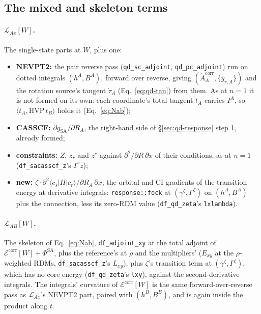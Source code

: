 \documentclass[11pt]{article}
\newcommand{\code}[1]{\texttt{#1}}
\newcommand{\Lag}{\mathcal L}
\begin{document}
\subsection{The mixed and skeleton terms}
\label{sec:qd-mixed}

\paragraph{$\Lag_{Ax}[W]$.} The single-state parts at $W$, plus one:
\begin{itemize}
\item \textbf{NEVPT2:} the pair reverse pass (\code{qd\_sc\_adjoint},
  \code{qd\_pc\_adjoint}) run on dotted integrals $(h^A, B^A)$, forward
  over reverse, giving $(\dot A^{\mathrm{corr}}_A, \{\dot{\bar y}_{r,A}\})$
  and the rotation source's tangent $\dot\tau_A$ (Eq.~\eqref{eq:qd-tau})
  from them. As at $n = 1$ it is not formed on its own: each coordinate's
  total tangent $t_A$ carries $I^A$, so $\langle t_A, \mathrm{HVP}\,t_B\rangle$
  holds it (Eq.~\eqref{eq:Nab});
\item \textbf{CASSCF:} $\partial g_{\mathrm{SA}}/\partial R_A$, the
  right-hand side of \S\ref{sec:qd-response} step 1, already formed;
\item \textbf{constraints:} $Z$, $z_r$ and $z^c$ against
  $\partial^2/\partial R\,\partial x$ of their conditions, as at $n = 1$
  (\code{df\_sacasscf\_z}'s $I^xz$);
\item \textbf{new:} $\zeta\cdot\partial^2\langle c_s|H|c_r\rangle/\partial
  R_A\,\partial x$, the orbital and CI gradients of the transition energy
  at derivative integrals: \code{response::fock} at $(\gamma^\zeta,
  \Gamma^\zeta)$ on $(h^A, B^A)$ plus the connection, less its zero-RDM
  value (\code{df\_qd\_zeta}'s \code{lxlambda}).
\end{itemize}

\paragraph{$\Lag_{AB}[W]$.} The skeleton of Eq.~\eqref{eq:Nab},
\code{df\_adjoint\_xy} at the total adjoint of $\mathcal
E^{\mathrm{corr}}[W] + \Phi^{\mathrm{SA}}$, plus the reference's at $\rho$
and the multipliers' ($E_{xy}$ at the $\rho$-weighted RDMs,
\code{df\_sacasscf\_z}'s $L_{xy}$), plus $\zeta$'s transition term at
$(\gamma^\zeta, \Gamma^\zeta)$, which has no core energy
(\code{df\_qd\_zeta}'s \code{lxy}), against the second-derivative integrals.
The integrals' curvature of $\mathcal E^{\mathrm{corr}}[W]$ is the same
forward-over-reverse pass as $\Lag_{Ax}$'s NEVPT2 part, paired with
$(h^B, B^B)$, and is again inside the product along $t$.
\end{document}
